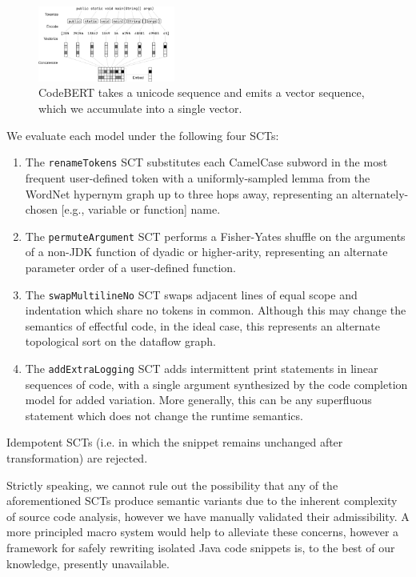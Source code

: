 \documentclass[sigconf,review,anonymous]{acmart}
\begin{document}
  \begin{figure}[H]
    \centering
    \includegraphics[width=0.40\textwidth]{figs/bert_embedding}
    \caption{CodeBERT takes a unicode sequence and emits a vector sequence, which we accumulate into a single vector.}
    \label{fig:bert}
  \end{figure}

  We evaluate each model under the following four SCTs:

  \begin{enumerate}
  \item The \lstinline|renameTokens| SCT substitutes each CamelCase subword in the most frequent user-defined token with a uniformly-sampled lemma from the WordNet hypernym graph up to three hops away, representing an alternately-chosen [e.g., variable or function] name.
  \item The \lstinline|permuteArgument| SCT performs a Fisher-Yates shuffle on the arguments of a non-JDK function of dyadic or higher-arity, representing an alternate parameter order of a user-defined function.
  \item The \lstinline|swapMultilineNo| SCT swaps adjacent lines of equal scope and indentation which share no tokens in common. Although this may change the semantics of effectful code, in the ideal case, this represents an alternate topological sort on the dataflow graph.
  \item The \lstinline|addExtraLogging| SCT adds intermittent print statements in linear sequences of code, with a single argument synthesized by the code completion model for added variation. More generally, this can be any superfluous statement which does not change the runtime semantics.
  \end{enumerate}

  Idempotent SCTs (i.e. in which the snippet remains unchanged after transformation) are rejected.

  Strictly speaking, we cannot rule out the possibility that any of the aforementioned SCTs produce semantic variants due to the inherent complexity of source code analysis, however we have manually validated their admissibility. A more principled macro system would help to alleviate these concerns, however a framework for safely rewriting isolated Java code snippets is, to the best of our knowledge, presently unavailable.
\end{document}
